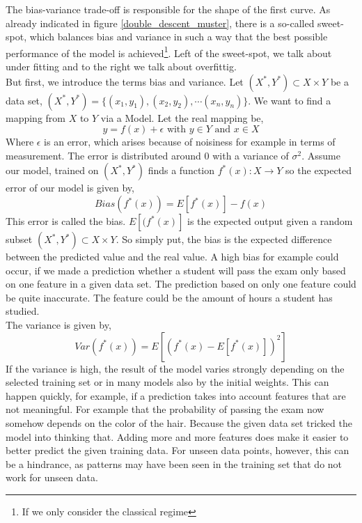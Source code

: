 The bias-variance trade-off is responsible for the shape of the first curve. As already indicated in figure \ref{double_descent_muster}, there is a so-called sweet-spot, which balances bias and variance in such a way that the best possible performance of the model is achieved\footnote{If we only consider the classical regime}. Left of the sweet-spot, we talk about under fitting and to the right we talk about overfittig.\\
But first, we introduce the terms bias and variance. Let $(X^{*},Y^*) \subset X \times Y$ be a data set, $(X^{*},Y^*)  = \{(x_1,y_1),(x_2,y_2),\cdots (x_n,y_n)\}$. We want to find a mapping from $X$ to $Y$ via a Model. Let the real mapping be,
$$
y = f(x) + \epsilon \text{ with } y \in Y \text{ and } x \in X
$$
Where $\epsilon$ is an error, which arises because of noisiness for example in terms of measurement. The error is distributed around $0$ with a variance of $\sigma^2$. Assume our model, trained on $(X^{*},Y^*)$ finds a function $f^{*}(x): X \rightarrow Y$ so the expected error of our model is given by,
$$
Bias(f^*(x)) = E[f^{*}(x)] - f(x)
$$
This error is called the bias. $E[(f^{*}(x)]$ is the expected output given a random subset $(X^{*},Y^*) \subset X \times Y$.  So simply put, the bias is the expected difference between the predicted value and the real value. A high bias for example could occur, if we made a prediction whether a student will pass the exam only based on one feature in a given data set. The prediction based on only one feature could be quite inaccurate. The feature could be the amount of hours a student has studied.\\
The variance is given by,
$$
Var(f^*(x)) = E[(f^{*}(x) - E[f^{*}(x)])^{2}]
$$
 If the variance is high, the result of the model varies strongly depending on the selected training set or in many models also by the initial weights. This can happen quickly, for example, if a prediction takes into account features that are not meaningful. For example that the probability of passing the exam now somehow depends on the color of the hair. Because the given data set tricked the model into thinking that. Adding more and more features does make it easier to better predict the given training data. For unseen data points, however, this can be a hindrance, as patterns may have been seen in the training set that do not work for unseen data.


